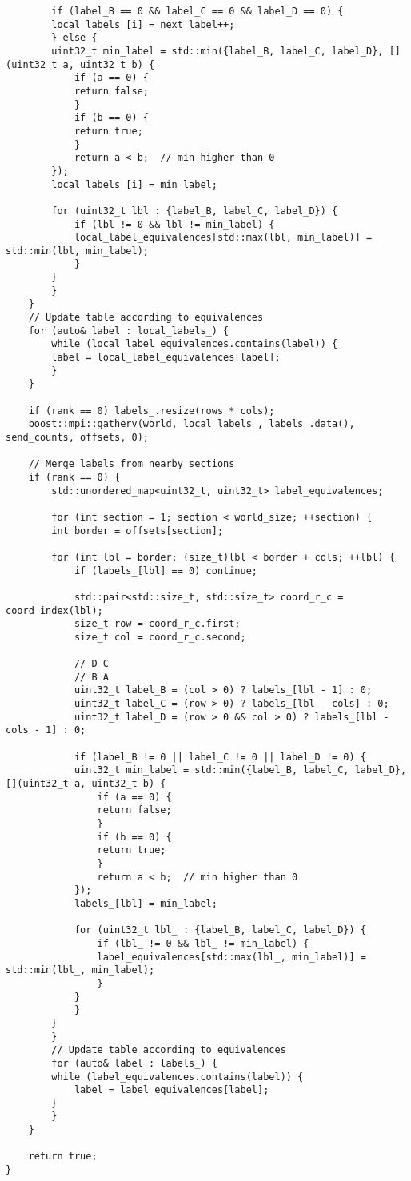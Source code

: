 \documentclass[a4paper,12pt]{article}
\begin{document}
\begin{lstlisting}
        if (label_B == 0 && label_C == 0 && label_D == 0) {
        local_labels_[i] = next_label++;
        } else {
        uint32_t min_label = std::min({label_B, label_C, label_D}, [](uint32_t a, uint32_t b) {
            if (a == 0) {
            return false;
            }
            if (b == 0) {
            return true;
            }
            return a < b;  // min higher than 0
        });
        local_labels_[i] = min_label;
    
        for (uint32_t lbl : {label_B, label_C, label_D}) {
            if (lbl != 0 && lbl != min_label) {
            local_label_equivalences[std::max(lbl, min_label)] = std::min(lbl, min_label);
            }
        }
        }
    }
    // Update table according to equivalences
    for (auto& label : local_labels_) {
        while (local_label_equivalences.contains(label)) {
        label = local_label_equivalences[label];
        }
    }
    
    if (rank == 0) labels_.resize(rows * cols);
    boost::mpi::gatherv(world, local_labels_, labels_.data(), send_counts, offsets, 0);
    
    // Merge labels from nearby sections
    if (rank == 0) {
        std::unordered_map<uint32_t, uint32_t> label_equivalences;
    
        for (int section = 1; section < world_size; ++section) {
        int border = offsets[section];
    
        for (int lbl = border; (size_t)lbl < border + cols; ++lbl) {
            if (labels_[lbl] == 0) continue;
    
            std::pair<std::size_t, std::size_t> coord_r_c = coord_index(lbl);
            size_t row = coord_r_c.first;
            size_t col = coord_r_c.second;
    
            // D C
            // B A
            uint32_t label_B = (col > 0) ? labels_[lbl - 1] : 0;
            uint32_t label_C = (row > 0) ? labels_[lbl - cols] : 0;
            uint32_t label_D = (row > 0 && col > 0) ? labels_[lbl - cols - 1] : 0;
    
            if (label_B != 0 || label_C != 0 || label_D != 0) {
            uint32_t min_label = std::min({label_B, label_C, label_D}, [](uint32_t a, uint32_t b) {
                if (a == 0) {
                return false;
                }
                if (b == 0) {
                return true;
                }
                return a < b;  // min higher than 0
            });
            labels_[lbl] = min_label;
    
            for (uint32_t lbl_ : {label_B, label_C, label_D}) {
                if (lbl_ != 0 && lbl_ != min_label) {
                label_equivalences[std::max(lbl_, min_label)] = std::min(lbl_, min_label);
                }
            }
            }
        }
        }
        // Update table according to equivalences
        for (auto& label : labels_) {
        while (label_equivalences.contains(label)) {
            label = label_equivalences[label];
        }
        }
    }
    
    return true;
}
\end{lstlisting}
\end{document}
